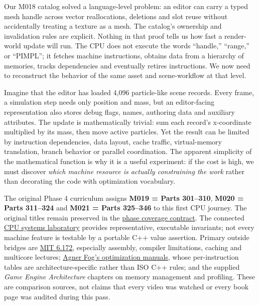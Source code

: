 Our M018 catalog solved a language-level problem: an editor can carry a typed mesh handle across vector reallocations, deletions and slot reuse without accidentally treating a texture as a mesh. The catalog's ownership and invalidation rules are explicit. Nothing in that proof tells us how fast a render-world update will run. The CPU does not execute the words ``handle,'' ``range,'' or ``PIMPL''; it fetches machine instructions, obtains data from a hierarchy of memories, tracks dependencies and eventually retires instructions. We now need to reconstruct the behavior of the same asset and scene-workflow at that level.

Imagine that the editor has loaded 4,096 particle-like scene records. Every frame, a simulation step needs only position and mass, but an editor-facing representation also stores debug flags, names, authoring data and auxiliary attributes. The update is mathematically trivial: sum each record's x-coordinate multiplied by its mass, then move active particles. Yet the result can be limited by instruction dependencies, data layout, cache traffic, virtual-memory translation, branch behavior or parallel coordination. The apparent simplicity of the mathematical function is why it is a useful experiment: if the cost is high, we must discover \emph{which machine resource is actually constraining the work} rather than decorating the code with optimization vocabulary.

The original Phase 4 curriculum assigns \textbf{M019 = Parts 301--310}, \textbf{M020 = Parts 311--324} and \textbf{M021 = Parts 325--346} to this first CPU journey. The original titles remain preserved in the \hyperref[appendix-fd090d982a15]{phase coverage contract}. The connected \href{tools/labs/phase4_cpu_systems_lab.cpp}{CPU systems laboratory} provides representative, executable invariants; not every machine feature is testable by a portable C++ value assertion. Primary outside bridges are \href{https://ocw.mit.edu/courses/6-172-performance-engineering-of-software-systems-fall-2018/video_galleries/lecture-videos/}{MIT 6.172}, especially assembly, compiler limitations, caching and multicore lectures; \href{https://www.agner.org/optimize/}{Agner Fog's optimization manuals}, whose per-instruction tables are architecture-specific rather than ISO C++ rules; and the supplied \emph{Game Engine Architecture} chapters on memory management and profiling. These are comparison sources, not claims that every video was watched or every book page was audited during this pass.

